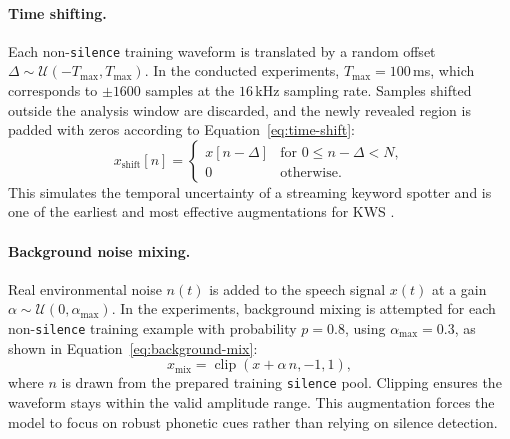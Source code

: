 \documentclass[11pt]{article}
\begin{document}
\paragraph{Time shifting.}
Each non-\texttt{silence} training waveform is translated by a random offset $\Delta \sim \mathcal{U}(-T_{\max}, T_{\max})$.
In the conducted experiments, \(T_{\max}=100\)\,ms, which corresponds to \(\pm 1600\) samples at the \(16\)\,kHz sampling rate. 
Samples shifted outside the analysis window are discarded, and the newly revealed region is padded with zeros according to Equation~\eqref{eq:time-shift}:
\begin{equation}
    \label{eq:time-shift}
    x_{\text{shift}}[n] = \begin{cases}
        x[n - \Delta] & \text{for } 0 \le n-\Delta < N,\\
        0 & \text{otherwise}.
    \end{cases}
\end{equation}
This simulates the temporal uncertainty of a streaming keyword spotter and is one of the earliest and most effective augmentations for KWS \cite{speechcommands,tcnn}.

\paragraph{Background noise mixing.}
Real environmental noise $n(t)$ is added to the speech signal $x(t)$ at a gain $\alpha \sim \mathcal{U}(0, \alpha_{\max})$.
In the experiments, background mixing is attempted for each non-\texttt{silence} training example with probability \(p=0.8\), using \(\alpha_{\max}=0.3\), as shown in Equation~\eqref{eq:background-mix}:
\begin{equation}
    \label{eq:background-mix}
    x_{\text{mix}} = \operatorname{clip}(x + \alpha\, n, -1, 1),
\end{equation}
where \(n\) is drawn from the prepared training \texttt{silence} pool. 
Clipping ensures the waveform stays within the valid amplitude range. 
This augmentation forces the model to focus on robust phonetic cues rather than relying on silence detection.
\end{document}
